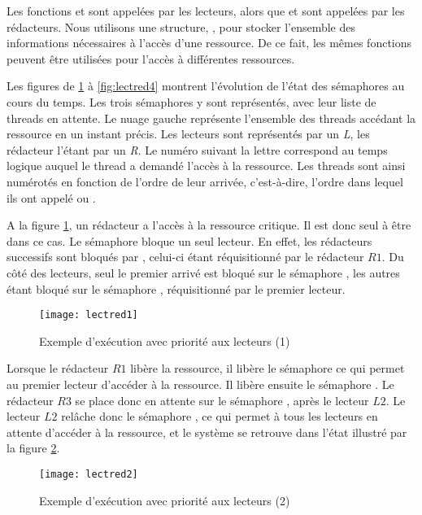 Les fonctions  et  sont appelées par les lecteurs, alors que  et  sont appelées par les rédacteurs. Nous utilisons une structure, , pour stocker l'ensemble des informations nécessaires à l'accès d'une ressource. De ce fait, les mêmes fonctions peuvent être utilisées pour l'accès à différentes ressources.

Les figures de \ref{fig:lectred1} à \ref{fig:lectred4} montrent l'évolution de l'état des sémaphores au cours du temps. Les trois sémaphores y sont représentés, avec leur liste de threads en attente. Le nuage gauche représente l'ensemble des threads accédant la ressource en un instant précis. Les lecteurs sont représentés par un \emph{L}, les rédacteur l'étant par un \emph{R}. Le numéro suivant la lettre correspond au temps logique auquel le thread a demandé l'accès à la ressource. Les threads sont ainsi numérotés en fonction de l'ordre de leur arrivée, c'est-à-dire, l'ordre dans lequel ils ont appelé  ou .

A la figure \ref{fig:lectred1}, un rédacteur a l'accès à la ressource critique. Il est donc seul à être dans ce cas. Le sémaphore  bloque un seul lecteur. En effet, les rédacteurs successifs sont bloqués par , celui-ci étant réquisitionné par le rédacteur $R1$. Du côté des lecteurs, seul le premier arrivé est bloqué sur le sémaphore , les autres étant bloqué sur le sémaphore , réquisitionné par le premier lecteur.

\begin{figure}[!ht]
  \centering
  \texttt{[image: lectred1]}
  \caption{\label{fig:lectred1}Exemple d'exécution avec priorité aux lecteurs (1)}
\end{figure}

Lorsque le rédacteur $R1$ libère la ressource, il libère le sémaphore  ce qui permet au premier lecteur d'accéder à la ressource.
Il libère ensuite le sémaphore . Le rédacteur $R3$ se place donc en attente sur le sémaphore , après le lecteur $L2$.
Le lecteur $L2$ relâche donc le sémaphore , ce qui permet à tous les lecteurs en attente d'accéder à la ressource, et le système se retrouve dans l'état illustré par la figure \ref{fig:lectred2}.

\begin{figure}[!ht]
  \centering
  \texttt{[image: lectred2]}
  \caption{\label{fig:lectred2}Exemple d'exécution avec priorité aux lecteurs (2)}
\end{figure}

